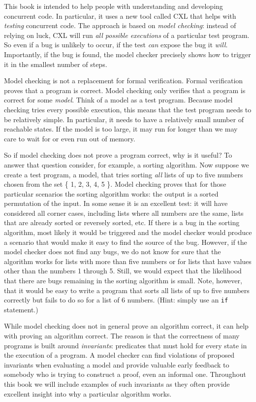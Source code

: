 \documentclass{report}
\begin{document}
This book is intended to help people with understanding and
developing concurrent code.  In particular, it uses a new tool
called CXL that helps with \emph{testing} concurrent code.
The approach is based on \emph{model checking}:
instead of relying
on luck, CXL will run \emph{all possible executions} of a particular
test program.  So even if a bug is unlikely to occur, if the test
\emph{can} expose the bug it \emph{will}.  Importantly, if the bug is
found, the model checker precisely shows how to trigger it in
the smallest number of steps.

Model checking is not a replacement for formal verification.
Formal verification proves that a program is correct.  Model checking only
verifies that a program is correct for some \emph{model}.  Think of
a model as a test program.  Because model checking tries every possible
execution, this means that the test program needs to be relatively
simple.  In particular, it needs to have a relatively small number of
reachable states.
If the model is too large, it may run for longer than we may care to
wait for or even run out of memory.

So if model checking does not prove a program correct, why is it
useful?  To answer that question consider, for example, a sorting
algorithm.
Now suppose we create a test program, a model, that tries sorting
\emph{all} lists of up to five numbers chosen from the set \{ 1,
2, 3, 4, 5 \}.  Model checking proves that for those particular
scenarios the sorting algorithm works: the output is a sorted
permutation of the input.  In some sense it is an excellent test:
it will have considered all corner cases, including lists where all
numbers are the same, lists that are already sorted or reversely
sorted, etc.  If there is a bug in the sorting algorithm, most
likely it would be triggered and the model checker would produce a
scenario that would make it easy to find the source of the bug.
However, if the model checker does not find any bugs, we do not
know for sure that the algorithm works for lists with more than
five numbers or for lists that have values other than the numbers
1 through 5.  Still, we would expect that the likelihood that there
are bugs remaining in the sorting algorithm is small.
Note, however, that it would be easy to write a program
that sorts all lists of up to five numbers correctly but fails to
do so for a list of 6 numbers.  (Hint: simply use an \texttt{if}
statement.)

While model checking does not in general prove an algorithm correct,
it can help with proving an algorithm correct.
The reason is that the correctness of many programs is built around
\emph{invariants}:
predicates that must hold for every state in the
execution of a program.  A model checker can find violations of
proposed invariants when evaluating a model and provide valuable early
feedback to somebody who is trying to construct a proof, even an
informal one.
Throughout this book we will include examples
of such invariants as they often provide excellent insight into
why a particular algorithm works.
\end{document}
